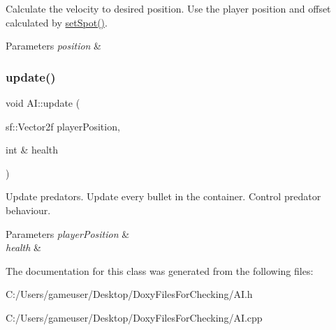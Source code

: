 Calculate the velocity to desired position. Use the player position and offset calculated by \mbox{\hyperlink{class_a_i_a128f8cf306126950c7085f582ed671c5}{set\+Spot()}}. 


\begin{DoxyParams}{Parameters}
{\em position} & \\
\hline
\end{DoxyParams}
\mbox{\label{class_a_i_ae8fa5ecda8a59f687bd75be465994467}} 
\subsubsection{\texorpdfstring{update()}{update()}}
{\footnotesize\ttfamily void A\+I\+::update (\begin{DoxyParamCaption}\item[{sf\+::\+Vector2f}]{player\+Position,  }\item[{int \&}]{health }\end{DoxyParamCaption})}



Update predators. Update every bullet in the container. Control predator behaviour. 


\begin{DoxyParams}{Parameters}
{\em player\+Position} & \\
\hline
{\em health} & \\
\hline
\end{DoxyParams}


The documentation for this class was generated from the following files\+:\begin{DoxyCompactItemize}
\item 
C\+:/\+Users/gameuser/\+Desktop/\+Doxy\+Files\+For\+Checking/A\+I.\+h\item 
C\+:/\+Users/gameuser/\+Desktop/\+Doxy\+Files\+For\+Checking/A\+I.\+cpp\end{DoxyCompactItemize}
